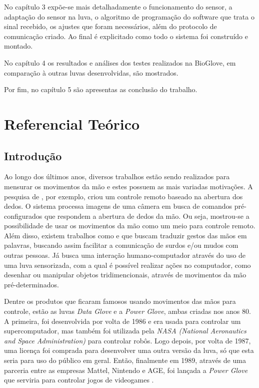\documentclass[
	12pt,				%
	openright,			%
	oneside,			%
	a4paper,			%
	english,			%
	brazil				%
	]{abntex2}
\begin{document}
		No capítulo 3 expõe-se mais detalhadamente o funcionamento do sensor, a adaptação do sensor na luva, o algoritmo de programação do software que trata o sinal recebido, os ajustes que foram necessários, além do protocolo de comunicação criado. Ao final é explicitado como todo o sistema foi construído e montado.

		No capítulo 4 os resultados e análises dos testes realizados na BioGlove, em comparação à outras luvas desenvolvidas, são mostrados.

		Por fim, no capítulo 5 são apresentas as conclusão do trabalho.
		





	
	\chapter{Referencial Teórico}

		\section{Introdução}

		Ao longo dos últimos anos, diversos trabalhos estão sendo realizados para mensurar os movimentos da mão e estes possuem as mais variadas motivações. A pesquisa de \cite{daeholee2009vision}, por exemplo, criou um controle remoto baseado na abertura dos dedos. O sistema processa imagens de uma câmera em busca de comandos pré-configurados que respondem a abertura de dedos da mão. Ou seja, mostrou-se a possibilidade de usar os movimentos da mão como um meio para controle remoto. Além disso, existem trabalhos como \cite{solanki2013sign} e \cite{anbarasi2013deafmute} que buscam traduzir gestos das mãos em palavras, buscando assim facilitar a comunicação de surdos e/ou mudos com outras pessoas. Já \cite{kumar2012hci} busca uma interação humano-computador através do uso de uma luva sensorizada, com a qual é possível realizar ações no computador, como desenhar ou manipular objetos tridimencionais, através de movimentos da mão pré-determinados.

		Dentre os produtos que ficaram famosos usando movimentos das mãos para controle, estão as luvas \textit{Data Glove} e a \textit{Power Glove}, ambas criadas nos anos 80. A primeira, foi desenvolvida por volta de 1986 e era usada para controlar um supercomputador, mas também foi utilizada pela \textit{NASA (National Aeronautics and Space Administration)} para controlar robôs. Logo depois, por volta de 1987, uma licença foi comprada para desenvolver uma outra versão da luva, só que esta seria para uso do público em geral. Então, finalmente em 1989, através de uma parceria entre as empresas Mattel, Nintendo e AGE, foi lançada a \textit{Power Glove} que serviria para controlar jogos de videogames \cite{dana1989powerglove}.
\end{document}
